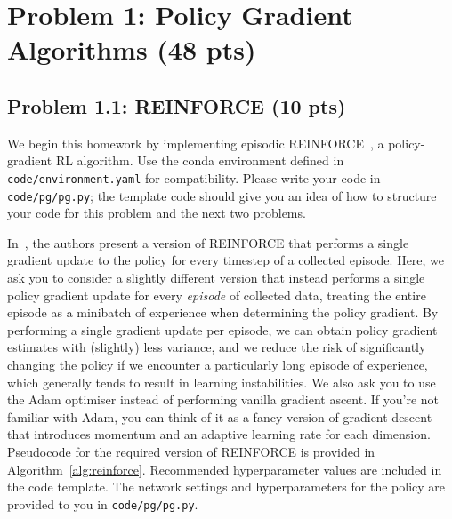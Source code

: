 \documentclass[12pt]{article}
\begin{document}
\section*{Problem 1: Policy Gradient Algorithms (48 pts)}


\subsection*{Problem 1.1: REINFORCE (10 pts)}
 
We begin this homework by implementing episodic REINFORCE~\cite{reinforce}, a policy-gradient RL algorithm. Use the conda environment defined in \texttt{code/environment.yaml} for compatibility. Please write your code in \texttt{code/pg/pg.py}; the template code should give you an idea of how to structure your code for this problem and the next two problems.

In~\cite{sutton2018reinforcement}, the authors present a version of REINFORCE that performs a single gradient update to the policy for every timestep of a collected episode. Here, we ask you to consider a slightly different version that instead performs a single policy gradient update for every \textit{episode} of collected data, treating the entire episode as a minibatch of experience when determining the policy gradient. By performing a single gradient update per episode, we can obtain policy gradient estimates with (slightly) less variance, and we reduce the risk of significantly changing the policy if we encounter a particularly long episode of experience, which generally tends to result in learning instabilities. We also ask you to use the Adam optimiser instead of performing vanilla gradient ascent. If you're not familiar with Adam, you can think of it as a fancy version of gradient descent that introduces momentum and an adaptive learning rate for each dimension. Pseudocode for the required version of REINFORCE is provided in Algorithm~\ref{alg:reinforce}. Recommended hyperparameter values are included in the code template. The network settings and hyperparameters for the policy are provided to you in \texttt{code/pg/pg.py}. 

\end{document}
